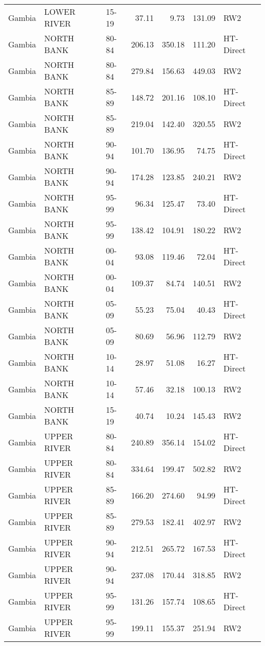 \begin{longtable}{lllrrrl}
  Gambia & LOWER RIVER & 15-19 & 37.11 & 9.73 & 131.09 & RW2 \\ 
  Gambia & NORTH BANK & 80-84 & 206.13 & 350.18 & 111.20 & HT-Direct \\ 
  Gambia & NORTH BANK & 80-84 & 279.84 & 156.63 & 449.03 & RW2 \\ 
  Gambia & NORTH BANK & 85-89 & 148.72 & 201.16 & 108.10 & HT-Direct \\ 
  Gambia & NORTH BANK & 85-89 & 219.04 & 142.40 & 320.55 & RW2 \\ 
  Gambia & NORTH BANK & 90-94 & 101.70 & 136.95 & 74.75 & HT-Direct \\ 
  Gambia & NORTH BANK & 90-94 & 174.28 & 123.85 & 240.21 & RW2 \\ 
  Gambia & NORTH BANK & 95-99 & 96.34 & 125.47 & 73.40 & HT-Direct \\ 
  Gambia & NORTH BANK & 95-99 & 138.42 & 104.91 & 180.22 & RW2 \\ 
  Gambia & NORTH BANK & 00-04 & 93.08 & 119.46 & 72.04 & HT-Direct \\ 
  Gambia & NORTH BANK & 00-04 & 109.37 & 84.74 & 140.51 & RW2 \\ 
  Gambia & NORTH BANK & 05-09 & 55.23 & 75.04 & 40.43 & HT-Direct \\ 
  Gambia & NORTH BANK & 05-09 & 80.69 & 56.96 & 112.79 & RW2 \\ 
  Gambia & NORTH BANK & 10-14 & 28.97 & 51.08 & 16.27 & HT-Direct \\ 
  Gambia & NORTH BANK & 10-14 & 57.46 & 32.18 & 100.13 & RW2 \\ 
  Gambia & NORTH BANK & 15-19 & 40.74 & 10.24 & 145.43 & RW2 \\ 
  Gambia & UPPER RIVER & 80-84 & 240.89 & 356.14 & 154.02 & HT-Direct \\ 
  Gambia & UPPER RIVER & 80-84 & 334.64 & 199.47 & 502.82 & RW2 \\ 
  Gambia & UPPER RIVER & 85-89 & 166.20 & 274.60 & 94.99 & HT-Direct \\ 
  Gambia & UPPER RIVER & 85-89 & 279.53 & 182.41 & 402.97 & RW2 \\ 
  Gambia & UPPER RIVER & 90-94 & 212.51 & 265.72 & 167.53 & HT-Direct \\ 
  Gambia & UPPER RIVER & 90-94 & 237.08 & 170.44 & 318.85 & RW2 \\ 
  Gambia & UPPER RIVER & 95-99 & 131.26 & 157.74 & 108.65 & HT-Direct \\ 
  Gambia & UPPER RIVER & 95-99 & 199.11 & 155.37 & 251.94 & RW2 \\ 

\end{longtable}
